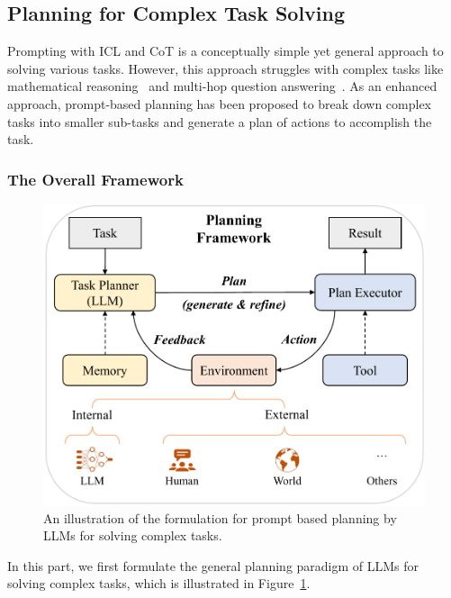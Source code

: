 \subsection{Planning for Complex Task Solving}
\label{subsec-planning}
Prompting with ICL and CoT is a conceptually simple yet general approach to solving various tasks. 
However, this approach struggles with complex tasks like mathematical reasoning~\cite{Qian-2022-arXiv-limitations} and multi-hop question answering~\cite{Ning-arxiv-2023-ChatGPT}.
As an enhanced approach, prompt-based planning has been proposed to break down complex tasks into smaller sub-tasks and generate a plan of actions to accomplish the task.

\subsubsection{The Overall Framework}

\begin{figure}[t]
    \centering
    \includegraphics[width=\linewidth]{images/planning-v3.pdf}
    \caption{An illustration of the formulation for prompt based planning by LLMs for solving complex tasks.}
    \label{fig:planning}
\end{figure}

In this part, we first formulate the general planning paradigm of LLMs for solving complex tasks, which is illustrated in Figure~\ref{fig:planning}.

